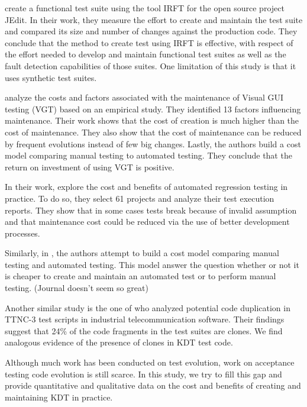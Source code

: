 \textcite{Shewchuk2010} create a functional test suite using the tool IRFT for the open source project JEdit. In their work, they measure the effort to create and maintain the test suite and compared its size and number of changes against the production code. They conclude that the method to create test using IRFT is effective, with respect of the effort needed to develop and maintain functional test suites as well as the fault detection capabilities of those suites. One limitation of this study is that it uses synthetic test suites.

\textcite{Alegroth2013, Alegroth2016} analyze the costs and factors associated with the maintenance of Visual GUI testing (VGT) based on an empirical study. They identified 13 factors influencing maintenance. Their work shows that the cost of creation is much higher than the cost of maintenance. They also show that the cost of maintenance can be reduced by frequent evolutions instead of few big changes. Lastly, the authors build a cost model comparing manual testing to automated testing. They conclude that the return on investment of using VGT is positive.

In their work, \textcite{Labuschagne2017} explore the cost and benefits of automated regression testing in practice. To do so, they select 61 projects and analyze their test execution reports. They show that in some cases tests break because of invalid assumption and that maintenance cost could be reduced via the use of better development processes.

Similarly, in \cite{Kan2013}, the authors attempt to build a cost model comparing manual testing and automated testing. This model answer the question whether or not it is cheaper to create and maintain an automated test or to perform manual testing. (Journal doesn't seem so great)

Another similar study is the one of \textcite{Lavoie2017} who analyzed potential code duplication in TTNC-3 test scripts in industrial telecommunication software. Their findings suggest that 24\% of the code fragments in the test suites are clones. We find analogous evidence of the presence of clones in KDT test code.

Although much work has been conducted on test evolution, work on acceptance testing code evolution is still scarce. In this study, we try to fill this gap and provide quantitative and qualitative data on the cost and benefits of creating and maintaining KDT in practice.


